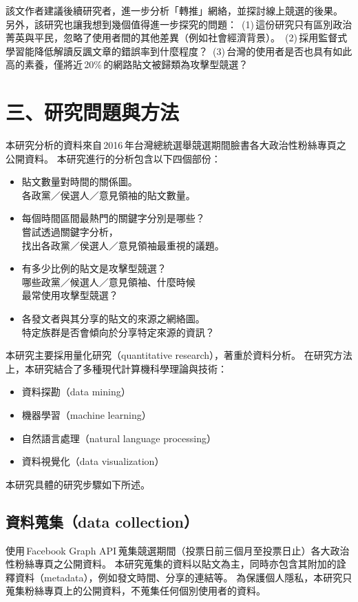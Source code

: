 \documentclass[letterpaper, 10pt, conference]{ieeeconf}   %
\begin{document}
\begin{CJK*}{UTF8}{bsmi}
該文作者建議後續研究者，進一步分析「轉推」網絡，並探討線上競選的後果。
另外，該研究也讓我想到幾個值得進一步探究的問題：
\,(1)\,這份研究只有區別政治菁英與平民，忽略了使用者間的其他差異（例如社會經濟背景）。
\,(2)\,採用監督式學習能降低解讀反諷文章的錯誤率到什麼程度？
\,(3)\,台灣的使用者是否也具有如此高的素養，僅將近\,20\%\,的網路貼文被歸類為攻擊型競選？

\section*{三、研究問題與方法}

本研究分析的資料來自\,2016\,年台灣總統選舉競選期間臉書各大政治性粉絲專頁之公開資料。
本研究進行的分析包含以下四個部份：
\begin{itemize}
\item 貼文數量對時間的關係圖。\\
各政黨／侯選人／意見領袖的貼文數量。
\item 每個時間區間最熱門的關鍵字分別是哪些？\\
嘗試透過關鍵字分析，\\
找出各政黨／侯選人／意見領袖最重視的議題。
\item 有多少比例的貼文是攻擊型競選？\\
哪些政黨／候選人／意見領袖、什麼時候\\
最常使用攻擊型競選？
\item 各發文者與其分享的貼文的來源之網絡圖。\\
特定族群是否會傾向於分享特定來源的資訊？
\end{itemize}

本研究主要採用量化研究（quantitative research），著重於資料分析。
在研究方法上，本研究結合了多種現代計算機科學理論與技術：
\begin{itemize}
\item 資料探勘（data mining）
\item 機器學習（machine learning）
\item 自然語言處理（natural language processing）
\item 資料視覺化（data visualization）
\end{itemize}

本研究具體的研究步驟如下所述。

\subsection*{資料蒐集（data collection）}

使用\,Facebook Graph API\,蒐集競選期間（投票日前三個月至投票日止）各大政治性粉絲專頁之公開資料。
本研究蒐集的資料以貼文為主，同時亦包含其附加的詮釋資料（metadata），例如發文時間、分享的連結等。
為保護個人隱私，本研究只蒐集粉絲專頁上的公開資料，不蒐集任何個別使用者的資料。


\end{CJK*}
\end{document}
